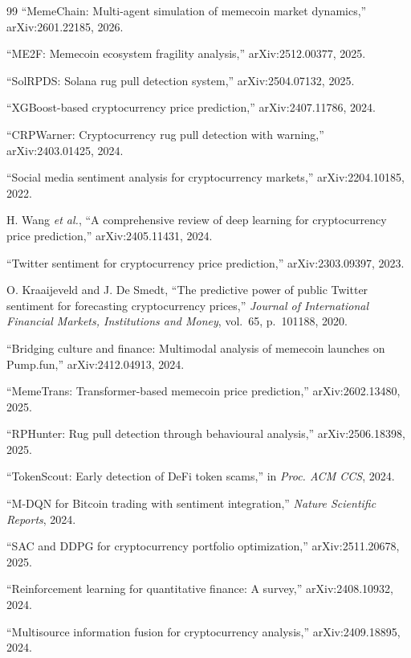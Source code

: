 \documentclass[12pt,a4paper,oneside,openany]{book}
\begin{document}
\begin{itemize}[leftmargin=8mm]
\begin{thebibliography}{99}
 ``MemeChain: Multi-agent simulation of memecoin market dynamics,'' arXiv:2601.22185, 2026.

 ``ME2F: Memecoin ecosystem fragility analysis,'' arXiv:2512.00377, 2025.

 ``SolRPDS: Solana rug pull detection system,'' arXiv:2504.07132, 2025.

 ``XGBoost-based cryptocurrency price prediction,'' arXiv:2407.11786, 2024.

 ``CRPWarner: Cryptocurrency rug pull detection with warning,'' arXiv:2403.01425, 2024.

 ``Social media sentiment analysis for cryptocurrency markets,'' arXiv:2204.10185, 2022.

 H. Wang \textit{et al.}, ``A comprehensive review of deep learning for cryptocurrency price prediction,'' arXiv:2405.11431, 2024.

 ``Twitter sentiment for cryptocurrency price prediction,'' arXiv:2303.09397, 2023.

 O. Kraaijeveld and J. De Smedt, ``The predictive power of public Twitter sentiment for forecasting cryptocurrency prices,'' \textit{Journal of International Financial Markets, Institutions and Money}, vol.~65, p.~101188, 2020.

 ``Bridging culture and finance: Multimodal analysis of memecoin launches on Pump.fun,'' arXiv:2412.04913, 2024.

 ``MemeTrans: Transformer-based memecoin price prediction,'' arXiv:2602.13480, 2025.

 ``RPHunter: Rug pull detection through behavioural analysis,'' arXiv:2506.18398, 2025.

 ``TokenScout: Early detection of DeFi token scams,'' in \textit{Proc. ACM CCS}, 2024.

 ``M-DQN for Bitcoin trading with sentiment integration,'' \textit{Nature Scientific Reports}, 2024.

 ``SAC and DDPG for cryptocurrency portfolio optimization,'' arXiv:2511.20678, 2025.

 ``Reinforcement learning for quantitative finance: A survey,'' arXiv:2408.10932, 2024.

 ``Multisource information fusion for cryptocurrency analysis,'' arXiv:2409.18895, 2024.


\end{thebibliography}
\end{itemize}
\end{document}
